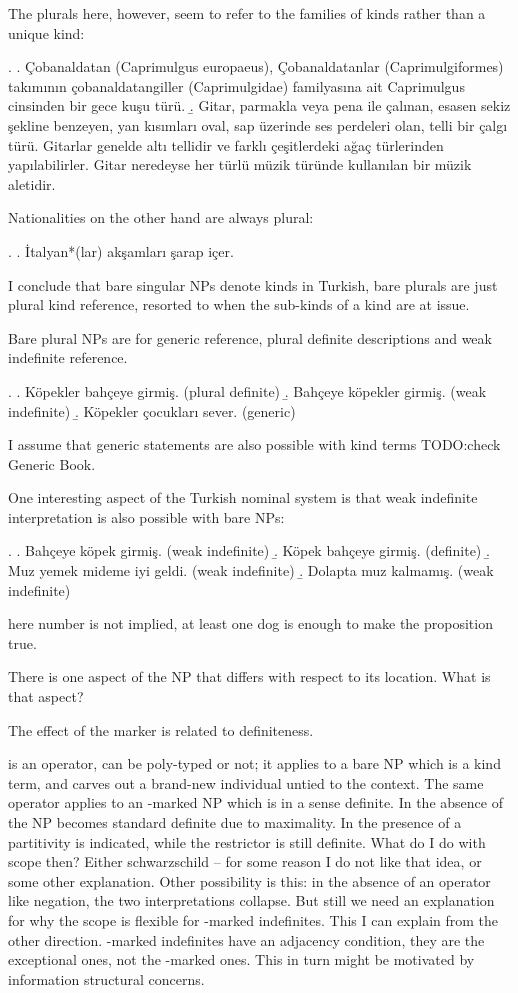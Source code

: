 \documentclass[11pt,a4paper]{article}
\begin{document}
The plurals here, however, seem to refer to the families of kinds rather than a unique kind:

\ex.
\a. Çobanaldatan (Caprimulgus europaeus), Çobanaldatanlar (Caprimulgiformes) takımının çobanaldatangiller (Caprimulgidae) familyasına ait Caprimulgus cinsinden bir gece kuşu türü.
\b. Gitar, parmakla veya pena ile çalınan, esasen sekiz şekline benzeyen, yan kısımları oval, sap üzerinde ses perdeleri olan, telli bir çalgı türü. Gitarlar genelde altı tellidir ve farklı çeşitlerdeki ağaç türlerinden yapılabilirler. Gitar neredeyse her türlü müzik türünde kullanılan bir müzik aletidir. 


Nationalities on the other hand are always plural:

\ex.
\a. İtalyan*(lar) akşamları şarap içer.

I conclude that bare singular NPs denote kinds in Turkish, bare plurals are just plural kind reference, resorted to when the sub-kinds of a kind are at issue.



Bare plural NPs are for generic reference, plural definite descriptions and weak indefinite reference.

\ex.
\a. Köpekler bahçeye girmiş. (plural definite)
\b. Bahçeye köpekler girmiş. (weak indefinite)
\b. Köpekler çocukları sever. (generic)

I assume that generic statements are also possible with kind terms TODO:check Generic Book.

One interesting aspect of the Turkish nominal system is that weak indefinite interpretation is also possible with bare NPs: 

\ex.
\a. Bahçeye köpek girmiş. (weak indefinite)
\b. Köpek bahçeye girmiş. (definite)
\b. Muz yemek mideme iyi geldi. (weak indefinite)
\b. Dolapta muz kalmamış. (weak indefinite)

here number is not implied, at least one dog is enough to make the proposition true.

There is one aspect of the NP that differs with respect to its location. What is that aspect?



The effect of the marker is related to definiteness.

 is an operator, can be poly-typed or not; it applies to a bare NP which is a kind term, and carves out a brand-new individual untied to the context. The same operator applies to an \acc-marked NP which is in a sense definite. In the absence of  the NP becomes standard definite due to maximality. In the presence of  a partitivity is indicated, while the restrictor is still definite. What do I do with scope then? Either schwarzschild -- for some reason I do not like that idea, or some other explanation. Other possibility is this: in the absence of an operator like negation, the two interpretations collapse. But still we need an explanation for why the scope is flexible for \acc-marked indefinites. This I can explain from the other direction. \zero-marked indefinites have an adjacency condition, they are the exceptional ones, not the \acc-marked ones. This in turn might be motivated by information structural concerns.    
\end{document}
